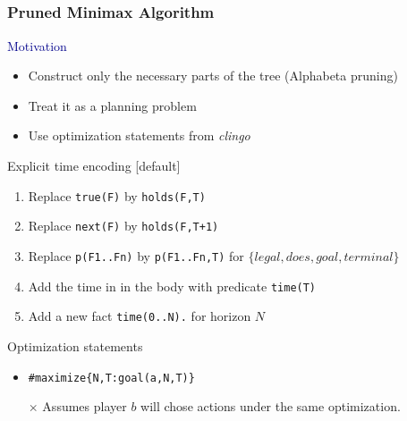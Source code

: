 \documentclass{beamer}
\newcommand\re[1]{\textcolor{darkblue}{#1}}
\begin{document}
\subsection{}
\begin{framefont}{\footnotesize}
  \begin{frame}
    \frametitle{Pruned Minimax Algorithm}
    \re{Motivation}
    \begin{itemize}[<+->]
      \item Construct only the necessary parts of the tree (Alphabeta pruning)
      \item Treat it as a planning problem
      \item Use optimization statements from \textit{clingo}
    \end{itemize}

    \pause
    Explicit time encoding
    [default]
    \begin{enumerate}[<+->]
      \item Replace \texttt{true(F)} by \texttt{holds(F,T)}
      \item Replace \texttt{next(F)} by \texttt{holds(F,T+1)}
      \item Replace \texttt{p(F1..Fn)} by \texttt{p(F1..Fn,T)} for $\{ legal,does,goal,terminal\}$
      \item Add the time in in the body with predicate \texttt{time(T)}
      \item Add a new fact \texttt{time(0..N).} for horizon $N$
      \end{enumerate}
      \pause
      Optimization statements
      \begin{itemize}[<+->]
        \item \texttt{\#maximize\{N,T:goal(a,N,T)\}}
        \item[$\times$] Assumes player $b$ will chose actions under the same optimization. 
      \end{itemize}
  \end{frame}
\end{framefont}
\end{document}
